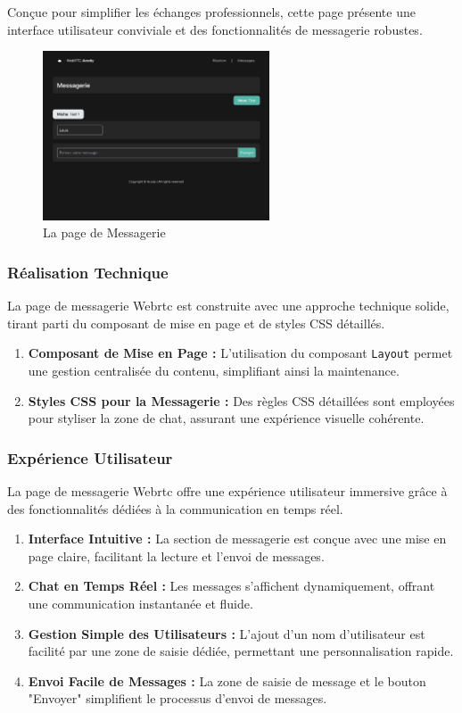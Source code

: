 \documentclass[12pt, a4paper, oneside]{thesis}
\begin{document}
Conçue pour simplifier les échanges professionnels, cette page présente une interface utilisateur conviviale et des fonctionnalités de messagerie robustes.

\begin{figure}[h]
  \centering
  \includegraphics[width=0.6\textwidth]{images/MessageriePres.png}
  \caption{La page de Messagerie}
\end{figure}

\subsubsection{Réalisation Technique}
La page de messagerie Webrtc est construite avec une approche technique solide, tirant parti du composant de mise en page et de styles CSS détaillés.

\begin{enumerate}
    \item \textbf{Composant de Mise en Page :} L'utilisation du composant \texttt{Layout} permet une gestion centralisée du contenu, simplifiant ainsi la maintenance.
    \item \textbf{Styles CSS pour la Messagerie :} Des règles CSS détaillées sont employées pour styliser la zone de chat, assurant une expérience visuelle cohérente.
\end{enumerate}

\subsubsection{Expérience Utilisateur}
La page de messagerie Webrtc offre une expérience utilisateur immersive grâce à des fonctionnalités dédiées à la communication en temps réel.

\begin{enumerate}
    \item \textbf{Interface Intuitive :} La section de messagerie est conçue avec une mise en page claire, facilitant la lecture et l'envoi de messages.
    \item \textbf{Chat en Temps Réel :} Les messages s'affichent dynamiquement, offrant une communication instantanée et fluide.
    \item \textbf{Gestion Simple des Utilisateurs :} L'ajout d'un nom d'utilisateur est facilité par une zone de saisie dédiée, permettant une personnalisation rapide.
    \item \textbf{Envoi Facile de Messages :} La zone de saisie de message et le bouton "Envoyer" simplifient le processus d'envoi de messages.
\end{enumerate}
\end{document}
